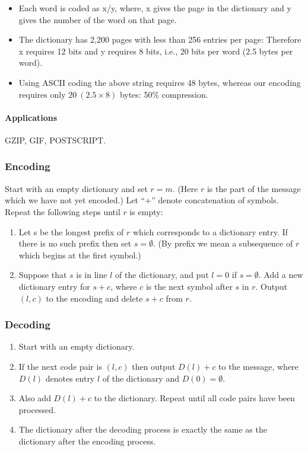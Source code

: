 \documentclass{article}
\begin{document}
\begin{itemize}
    \item Each word is coded as x/y, where, x gives the page in the dictionary and y gives the number of the word on that page.
    \item The dictionary has 2,200 pages with less than 256 entries per page: Therefore x requires 12 bits and y requires 8 bits, i.e., 20 bits per word (2.5 bytes per word).
    \item Using ASCII coding the above string requires 48 bytes, whereas our encoding requires only $20\ (2.5 \times 8)$ bytes: 50\% compression. \cite{utexasMbs}
\end{itemize}

\paragraph{Applications} GZIP, GIF, POSTSCRIPT.

\subsubsection{Encoding}

Start with an empty dictionary and set $r = m$. (Here $r$ is the part of the message which we have not yet encoded.) Let “$+$” denote concatenation of symbols. Repeat the following steps until $r$ is empty:
\begin{enumerate}
    \item Let s be the longest prefix of $r$ which corresponds to a dictionary entry. If there is no such prefix then set $s = \emptyset$. (By prefix we mean a subsequence of $r$ which begins at the first symbol.)
    \item Suppose that $s$ is in line $l$ of the dictionary, and put $l = 0$ if $s = \emptyset$. Add a new dictionary entry for $s + c$, where $c$ is the next symbol after $s$ in $r$. Output $(l, c)$ to the encoding and delete $s + c$ from $r$.
\end{enumerate}

\subsubsection{Decoding}

\begin{enumerate}
    \item Start with an empty dictionary.
    \item If the next code pair is $(l, c)$ then output $D(l) + c$ to the message, where $D(l)$ denotes entry $l$ of the dictionary and $D(0) = \emptyset$.
    \item Also add $D(l) + c$ to the dictionary. Repeat until all code pairs have been processed.
    \item The dictionary after the decoding process is exactly the same as the dictionary after the encoding process.
\end{enumerate}
\end{document}

